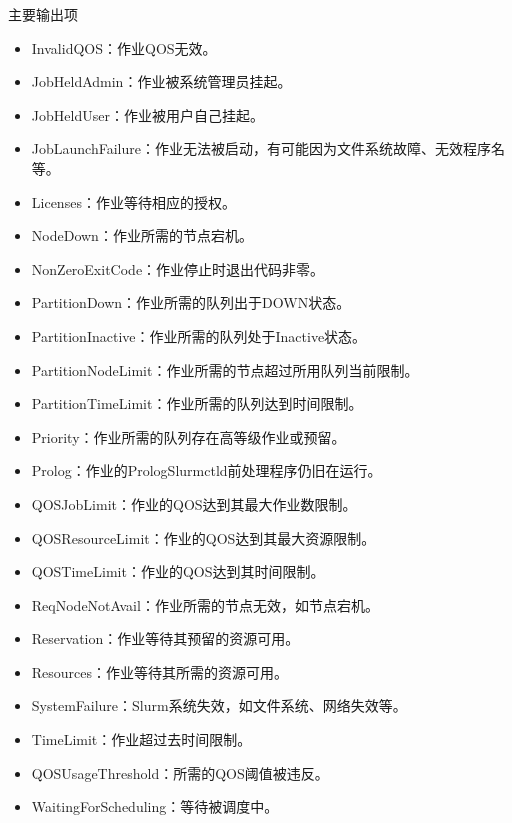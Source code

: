 \begin{frame}{主要输出项}
\begin{itemize}
\begin{itemize}
    \item InvalidQOS：作业QOS无效。
    \item JobHeldAdmin：作业被系统管理员挂起。
    \item JobHeldUser：作业被用户自己挂起。
    \item JobLaunchFailure：作业无法被启动，有可能因为文件系统故障、无效程序名等。
    \item Licenses：作业等待相应的授权。
    \item NodeDown：作业所需的节点宕机。
    \item NonZeroExitCode：作业停止时退出代码非零。
    \item PartitionDown：作业所需的队列出于DOWN状态。
    \item PartitionInactive：作业所需的队列处于Inactive状态。
    \item PartitionNodeLimit：作业所需的节点超过所用队列当前限制。
    \item PartitionTimeLimit：作业所需的队列达到时间限制。
    \item Priority：作业所需的队列存在高等级作业或预留。
    \item Prolog：作业的PrologSlurmctld前处理程序仍旧在运行。
    \item QOSJobLimit：作业的QOS达到其最大作业数限制。
    \item QOSResourceLimit：作业的QOS达到其最大资源限制。
    \item QOSTimeLimit：作业的QOS达到其时间限制。
    \item ReqNodeNotAvail：作业所需的节点无效，如节点宕机。
    \item Reservation：作业等待其预留的资源可用。
    \item Resources：作业等待其所需的资源可用。
    \item SystemFailure：Slurm系统失效，如文件系统、网络失效等。
    \item TimeLimit：作业超过去时间限制。
    \item QOSUsageThreshold：所需的QOS阈值被违反。
    \item WaitingForScheduling：等待被调度中。
\end{itemize}
\end{itemize}
\end{frame}


